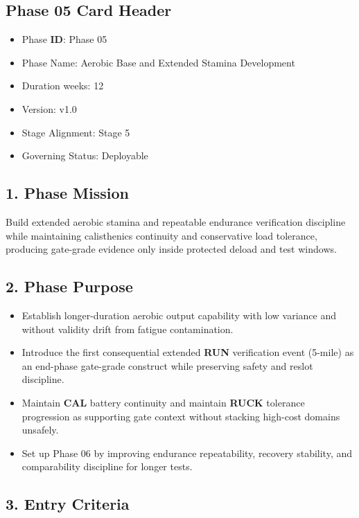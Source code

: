 \documentclass[10pt]{article}
\begin{document}
\subsection*{Phase 05 Card Header}
{}

\begin{itemize}
\item Phase \textbf{ID}: Phase 05
\item Phase Name: Aerobic Base and Extended Stamina Development
\item Duration weeks: 12
\item Version: v1.0
\item Stage Alignment: Stage 5
\item Governing Status: Deployable
\end{itemize}

\subsection*{1. Phase Mission}

Build extended aerobic stamina and repeatable endurance verification discipline while maintaining calisthenics continuity and conservative load tolerance, producing gate-grade evidence only inside protected deload and test windows.

\subsection*{2. Phase Purpose}

\begin{itemize}
\item Establish longer-duration aerobic output capability with low variance and without validity drift from fatigue contamination.
\item Introduce the first consequential extended \textbf{RUN} verification event (5-mile) as an end-phase gate-grade construct while preserving safety and reslot discipline.
\item Maintain \textbf{CAL} battery continuity and maintain \textbf{RUCK} tolerance progression as supporting gate context without stacking high-cost domains unsafely.
\item Set up Phase 06 by improving endurance repeatability, recovery stability, and comparability discipline for longer tests.
\end{itemize}

\subsection*{3. Entry Criteria}
\end{document}
